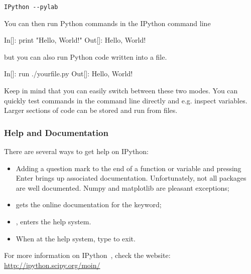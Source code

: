 \begin{description}
\begin{verbatim}
IPython --pylab
\end{verbatim}

You can then run Python commands in the IPython command line

\begin{python}
 In[]: print "Hello, World!"
Out[]: Hello, World!
\end{python}

but you can also run Python code written into a file.

\begin{python}
 In[]: run ./yourfile.py
Out[]: Hello, World!
\end{python}
\end{description}





Keep in mind that you can easily switch between these two modes. You can quickly test commands in the command line directly and e.g. inspect variables. Larger sections of code can be stored and run from files.

\subsubsection{Help and Documentation}

There are several ways to get help on IPython:

\begin{itemize}
\item Adding a question mark to the end of a function or variable and pressing Enter brings up associated documentation. Unfortunately, not all packages are well documented. Numpy and matplotlib are pleasant exceptions;
\item {} gets the online documentation for the  keyword;
\item {}, enters the help system.
\item When at the help system, type  to exit.
\end{itemize}

\noindent For more information on IPython~\citep{PER-GRA:2007}, check the website: \url{http://ipython.scipy.org/moin/}

